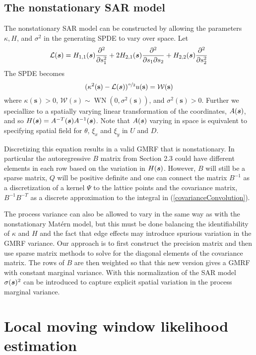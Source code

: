 \documentclass[review]{elsarticle}
\begin{document}
\subsection{The nonstationary SAR model}

The nonstationary SAR model can be constructed by allowing the parameters $\kappa, H$, and $\sigma^2$ in the generating SPDE to vary over space. 
Let
 \[
  {\cal{L}}(\mbox{\boldmath $s$}) = H_{1,1}(\mbox{\boldmath $s$}) \frac{\partial^2}{\partial s_1^2} +  2 H_{2,1}(\mbox{\boldmath $s$})\frac{\partial^2}{\partial s_1 \partial s_2} + H_{2,2}(\mbox{\boldmath $s$}) \frac{\partial^2}{\partial s_2^2}
\]
The SPDE becomes
$$ (\kappa^2(\mathbf s) - {\cal{L}}(\mbox{\boldmath $s$}) )^{\nicefrac{\alpha}{2}} u(\mathbf s) = \mathcal{W}(\mathbf s) $$
where $\kappa(\mathbf s) > 0$, $\mathcal{W}(s) \sim \operatorname{WN}(0, \sigma^2(\mathbf s))$, and $\sigma^2(\mathbf s) > 0$.  Further we speciallize to a spatially varying linear transformation of the coordinates, $A(\mbox{\boldmath $s$})$, and so  $H(\mbox{\boldmath $s$}) = A^{-T} (\mbox{\boldmath $s$}) A^{-1}(\mbox{\boldmath $s$})$. Note that $A(\mbox{\boldmath $s$})$ varying in space is equivalent to specifying spatial field for $\theta$, $\xi_x$ and $\xi_y$ in $U$ and $D$. 

Discretizing this equation results in a valid GMRF that is nonstationary. In particular the autoregressive $B$ matrix  from Section 2.3 could have  different elements in each row based on the variation in $H(\mbox{\boldmath $s$})$. However, $B$ will still be a sparse matrix, $Q$ will be positive definite and one can connect the matrix  $B^{-1} $ as  a discretization of a kernel $\Psi$ to the lattice points and the covariance matrix,   $B^{-1}B^{-T}$ as a discrete approximation to the integral in (\ref{covarianceConvolution}). 

The process variance can also be allowed to vary in the same way as with the nonstationary Mat\'ern model, but this must be done balancing the identifiability of $\kappa$ and $H$ and the fact that edge effects may introduce spurious variation in the  GMRF variance. Our approach is to first construct the precision matrix and then use sparse matrix methods to solve for the diagonal elements of the covariance matrix. The rows of $B$ are then weighted so that  this new version gives a GMRF with constant marginal variance. With this normalization of the SAR model $\sigma(\mbox{\boldmath $s$})^2$ can be introduced to capture explicit spatial variation in the process marginal variance. 

\section{Local moving window likelihood estimation}
\end{document}
